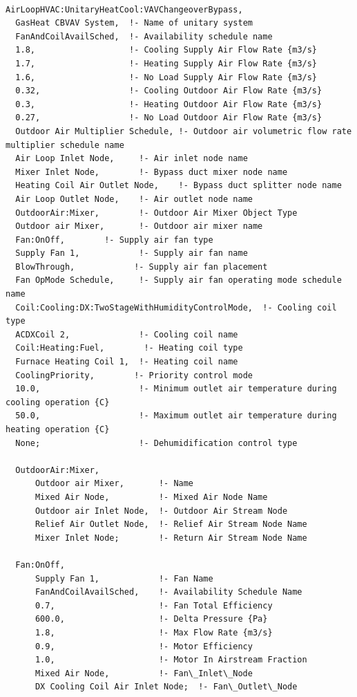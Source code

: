 \begin{lstlisting}

AirLoopHVAC:UnitaryHeatCool:VAVChangeoverBypass,
  GasHeat CBVAV System,  !- Name of unitary system
  FanAndCoilAvailSched,  !- Availability schedule name
  1.8,                   !- Cooling Supply Air Flow Rate {m3/s}
  1.7,                   !- Heating Supply Air Flow Rate {m3/s}
  1.6,                   !- No Load Supply Air Flow Rate {m3/s}
  0.32,                  !- Cooling Outdoor Air Flow Rate {m3/s}
  0.3,                   !- Heating Outdoor Air Flow Rate {m3/s}
  0.27,                  !- No Load Outdoor Air Flow Rate {m3/s}
  Outdoor Air Multiplier Schedule, !- Outdoor air volumetric flow rate multiplier schedule name
  Air Loop Inlet Node,     !- Air inlet node name
  Mixer Inlet Node,        !- Bypass duct mixer node name
  Heating Coil Air Outlet Node,    !- Bypass duct splitter node name
  Air Loop Outlet Node,    !- Air outlet node name
  OutdoorAir:Mixer,        !- Outdoor Air Mixer Object Type
  Outdoor air Mixer,       !- Outdoor air mixer name
  Fan:OnOff,        !- Supply air fan type
  Supply Fan 1,            !- Supply air fan name
  BlowThrough,            !- Supply air fan placement
  Fan OpMode Schedule,     !- Supply air fan operating mode schedule name
  Coil:Cooling:DX:TwoStageWithHumidityControlMode,  !- Cooling coil type
  ACDXCoil 2,              !- Cooling coil name
  Coil:Heating:Fuel,        !- Heating coil type
  Furnace Heating Coil 1,  !- Heating coil name
  CoolingPriority,        !- Priority control mode
  10.0,                    !- Minimum outlet air temperature during cooling operation {C}
  50.0,                    !- Maximum outlet air temperature during heating operation {C}
  None;                    !- Dehumidification control type

  OutdoorAir:Mixer,
      Outdoor air Mixer,       !- Name
      Mixed Air Node,          !- Mixed Air Node Name
      Outdoor air Inlet Node,  !- Outdoor Air Stream Node
      Relief Air Outlet Node,  !- Relief Air Stream Node Name
      Mixer Inlet Node;        !- Return Air Stream Node Name

  Fan:OnOff,
      Supply Fan 1,            !- Fan Name
      FanAndCoilAvailSched,    !- Availability Schedule Name
      0.7,                     !- Fan Total Efficiency
      600.0,                   !- Delta Pressure {Pa}
      1.8,                     !- Max Flow Rate {m3/s}
      0.9,                     !- Motor Efficiency
      1.0,                     !- Motor In Airstream Fraction
      Mixed Air Node,          !- Fan\_Inlet\_Node
      DX Cooling Coil Air Inlet Node;  !- Fan\_Outlet\_Node


\end{lstlisting}
